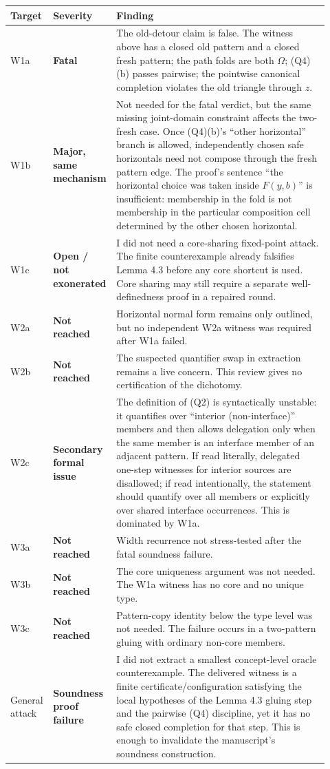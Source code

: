 \documentclass[11pt]{article}
\newcommand{\U}{\Omega}
\newcommand{\sev}[1]{\textbf{#1}}
\begin{document}
\begin{longtable}{p{0.12\linewidth}p{0.14\linewidth}p{0.66\linewidth}}
\toprule
Target & Severity & Finding\\
\midrule
W1a & \sev{Fatal} & The old-detour claim is false.  The witness above has a closed old pattern and a closed fresh pattern; the path folds are both $\U$; (Q4)(b) passes pairwise; the pointwise canonical completion violates the old triangle through $z$.\\
W1b & \sev{Major, same mechanism} & Not needed for the fatal verdict, but the same missing joint-domain constraint affects the two-fresh case.  Once (Q4)(b)'s ``other horizontal'' branch is allowed, independently chosen safe horizontals need not compose through the fresh pattern edge.  The proof's sentence ``the horizontal choice was taken inside $F(y,b)$'' is insufficient: membership in the fold is not membership in the particular composition cell determined by the other chosen horizontal.\\
W1c & \sev{Open / not exonerated} & I did not need a core-sharing fixed-point attack.  The finite counterexample already falsifies Lemma 4.3 before any core shortcut is used.  Core sharing may still require a separate well-definedness proof in a repaired round.\\
W2a & \sev{Not reached} & Horizontal normal form remains only outlined, but no independent W2a witness was required after W1a failed.\\
W2b & \sev{Not reached} & The suspected quantifier swap in extraction remains a live concern.  This review gives no certification of the dichotomy.\\
W2c & \sev{Secondary formal issue} & The definition of (Q2) is syntactically unstable: it quantifies over ``interior (non-interface)'' members and then allows delegation only when the same member is an interface member of an adjacent pattern.  If read literally, delegated one-step witnesses for interior sources are disallowed; if read intentionally, the statement should quantify over all members or explicitly over shared interface occurrences.  This is dominated by W1a.\\
W3a & \sev{Not reached} & Width recurrence not stress-tested after the fatal soundness failure.\\
W3b & \sev{Not reached} & The core uniqueness argument was not needed.  The W1a witness has no core and no unique type.\\
W3c & \sev{Not reached} & Pattern-copy identity below the type level was not needed.  The failure occurs in a two-pattern gluing with ordinary non-core members.\\
General attack & \sev{Soundness proof failure} & I did not extract a smallest concept-level oracle counterexample.  The delivered witness is a finite certificate/configuration satisfying the local hypotheses of the Lemma 4.3 gluing step and the pairwise (Q4) discipline, yet it has no safe closed completion for that step.  This is enough to invalidate the manuscript's soundness construction.\\
\bottomrule
\end{longtable}
\end{document}
